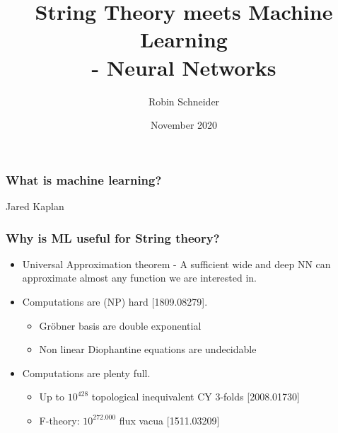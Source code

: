 \documentclass{beamer}
\title[Neural Networks]{String Theory meets Machine Learning\\
- Neural Networks}
\author[R. Schneider]{Robin Schneider}
\institute[Uppsala University]{Uppsala University}
\date[November 2020]{November 2020}
\newcommand{\bi}{\begin{itemize}}
\newcommand{\ei}{\end{itemize}}
\begin{document}
	
	\frame{\titlepage}
	
\begin{frame}
\frametitle{What is machine learning?}



\qquad \qquad \qquad \qquad Jared Kaplan

\end{frame}

\begin{frame}
\frametitle{Why is ML useful for String theory?}
\begin{itemize}
	\item Universal Approximation theorem - A sufficient wide and deep NN can approximate almost any function we are interested in.
	\item \pause Computations are (NP) hard {\color{blue} [1809.08279]}.
	\bi \item Gröbner basis are double exponential
	\item Non linear Diophantine equations are undecidable
	 \ei 
	\item \pause Computations are plenty full.
	\bi \item Up to $10^{428}$ topological inequivalent CY 3-folds {\color{blue} [2008.01730]} %
	\item F-theory: $10^{272.000}$ flux vacua {\color{blue} [1511.03209]}%
	\ei 
\end{itemize}

\end{frame}
\end{document}
